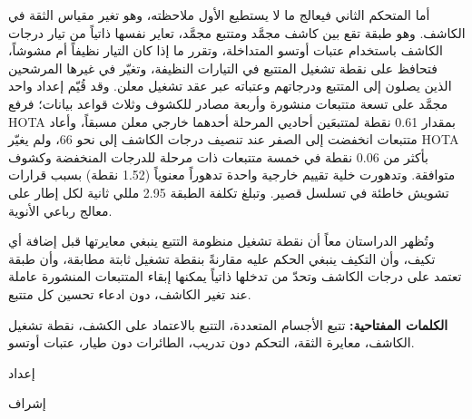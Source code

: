 \begin{otherlanguage}{arabic}
أما المتحكم الثاني فيعالج ما لا يستطيع الأول ملاحظته، وهو تغير مقياس الثقة في الكاشف. وهو طبقة تقع بين كاشف مجمَّد ومتتبع مجمَّد، تعاير نفسها ذاتياً من تيار درجات الكاشف باستخدام عتبات أوتسو المتداخلة، وتقرر ما إذا كان التيار نظيفاً أم مشوشاً، فتحافظ على نقطة تشغيل المتتبع في التيارات النظيفة، وتغيّر في غيرها المرشحين الذين يصلون إلى المتتبع ودرجاتهم وعتباته عبر عقد تشغيل معلن. وقد قُيّم إعداد واحد مجمَّد على تسعة متتبعات منشورة وأربعة مصادر للكشوف وثلاث قواعد بيانات؛ فرفع \foreignlanguage{english}{HOTA} بمقدار \foreignlanguage{english}{0.61} نقطة لمتتبعَين أحاديي المرحلة أحدهما خارجي معلن مسبقاً، وأعاد متتبعات انخفضت إلى الصفر عند تنصيف درجات الكاشف إلى نحو 66، ولم يغيّر \foreignlanguage{english}{HOTA} بأكثر من \foreignlanguage{english}{0.06} نقطة في خمسة متتبعات ذات مرحلة للدرجات المنخفضة وكشوف متوافقة. وتدهورت خلية تقييم خارجية واحدة تدهوراً معنوياً (\foreignlanguage{english}{1.52} نقطة) بسبب قرارات تشويش خاطئة في تسلسل قصير. وتبلغ تكلفة الطبقة \foreignlanguage{english}{2.95} مللي ثانية لكل إطار على معالج رباعي الأنوية.

وتُظهر الدراستان معاً أن نقطة تشغيل منظومة التتبع ينبغي معايرتها قبل إضافة أي تكيف، وأن التكيف ينبغي الحكم عليه مقارنةً بنقطة تشغيل ثابتة مطابقة، وأن طبقة تعتمد على درجات الكاشف وتحدّ من تدخلها ذاتياً يمكنها إبقاء المتتبعات المنشورة عاملة عند تغير الكاشف، دون ادعاء تحسين كل متتبع.

\vspace{0.5cm}
\noindent\textbf{الكلمات المفتاحية:} تتبع الأجسام المتعددة، التتبع بالاعتماد على الكشف، نقطة تشغيل الكاشف، معايرة الثقة، التحكم دون تدريب، الطائرات دون طيار، عتبات أوتسو.

\clearpage
\thispagestyle{empty}
\begin{center}
{\large \ArabicInstitution\par}
{\normalsize \ArabicDepartment\par}
\vspace{2.5cm}
{\LARGE\bfseries \ArabicTitle\par}
\vspace{2cm}
{\normalsize إعداد\par}
\vspace{0.3cm}
{\Large \ArabicAuthor\par}
\vspace{2cm}
{\normalsize \ArabicDegree\par}
\vspace{2cm}
{\normalsize إشراف\par}
\vspace{0.4cm}
{\large \ArabicSupervisorOne\par}
\vspace{0.3cm}
{\large \ArabicSupervisorTwo\par}
\vfill
{\normalsize \ArabicCity\par}
{\normalsize \foreignlanguage{english}{\ThesisYear}\par}
\end{center}
\end{otherlanguage}
